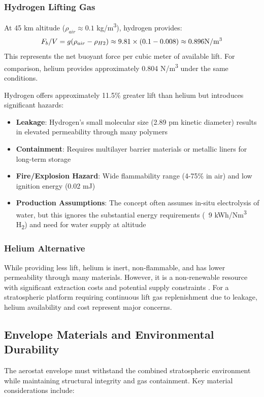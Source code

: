 \subsubsection{Hydrogen Lifting Gas}
At 45 km altitude ($\rho_{air} \approx 0.1$ kg/m\textsuperscript{3}), hydrogen provides:
\begin{equation}
F_b/V = g(\rho_{air} - \rho_{H2}) \approx 9.81 \times (0.1 - 0.008) \approx 0.896  \text{N/m}\textsuperscript{3}
\end{equation}
This represents the net buoyant force per cubic meter of available lift. For comparison, helium provides approximately 0.804 N/m\textsuperscript{3} under the same conditions.

Hydrogen offers approximately 11.5\% greater lift than helium but introduces significant hazards:
\begin{itemize}
    \item \textbf{Leakage}: Hydrogen's small molecular size (2.89 pm kinetic diameter) results in elevated permeability through many polymers \cite{sakurai2010}
    \item \textbf{Containment}: Requires multilayer barrier materials or metallic liners for long-term storage
    \item \textbf{Fire/Explosion Hazard}: Wide flammability range (4-75\% in air) and low ignition energy (0.02 mJ) \cite{zalkind2015}
    \item \textbf{Production Assumptions}: The concept often assumes in-situ electrolysis of water, but this ignores the substantial energy requirements (~9 kWh/Nm\textsuperscript{3} H\textsubscript{2}) and need for water supply at altitude
\end{itemize}

\subsubsection{Helium Alternative}
While providing less lift, helium is inert, non-flammable, and has lower permeability through many materials. However, it is a non-renewable resource with significant extraction costs and potential supply constraints \cite{schwartz2012}. For a stratospheric platform requiring continuous lift gas replenishment due to leakage, helium availability and cost represent major concerns.

\subsection{Envelope Materials and Environmental Durability}
The aerostat envelope must withstand the combined stratospheric environment while maintaining structural integrity and gas containment. Key material considerations include:

